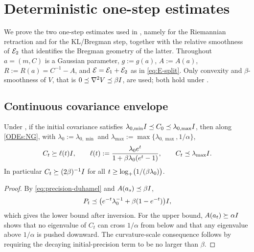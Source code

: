 \section{Deterministic one-step estimates}
\label{app:det-proofs}

We prove the two one-step estimates used in , namely
 for the Riemannian retraction and  for the
KL/Bregman step, together with the relative smoothness of $\mathcal{E}_2$ that identifies the
Bregman geometry of the latter. Throughout $a=(m,C)$ is a Gaussian parameter, $g:=g(a)$,
$A:=A(a)$, $R:=R(a)=C^{-1}-A$, and $\mathcal{E}=\mathcal{E}_1+\mathcal{E}_2$ as in \eqref{eq:E-split}. Only
convexity and $\beta$-smoothness of $V$, that is $0\preceq\nabla^2V\preceq\beta I$, are used;
both hold under .

\subsection{Continuous covariance envelope}

\begin{lemma}\label{lem:cov-cont}
    Under , if the initial covariance satisfies
    $\lambda_{0,\min}I\preceq C_0\preceq\lambda_{0,\max}I$, then along \eqref{ODEs:NG},
    with $\lambda_0:=\lambda_{0,\min}$ and
    $\lambda_{\max}:=\max\{\lambda_{0,\max},1/\alpha\}$,
    \begin{equation*}
        C_t\succeq\ell(t)I,
        \qquad
        \ell(t):=\frac{\lambda_0e^t}{1+\beta\lambda_0(e^t-1)},
        \qquad
        C_t\preceq\lambda_{\max}I .
    \end{equation*}
    In particular $C_t\succeq(2\beta)^{-1}I$ for all
    $t\geq\log_+\bigl(1/(\beta\lambda_0)\bigr)$.
\end{lemma}

\begin{proof}
    By \eqref{eq:precision-duhamel} and $A(a_s)\preceq\beta I$,
    \begin{equation*}
        P_t\preceq\bigl(e^{-t}\lambda_0^{-1}+\beta(1-e^{-t})\bigr)I,
    \end{equation*}
    which gives the lower bound after inversion. For the upper bound, $A(a_t)\succeq\alpha I$
    shows that no eigenvalue of $C_t$ can cross $1/\alpha$ from below and that any eigenvalue
    above $1/\alpha$ is pushed downward. The curvature-scale consequence follows by requiring
    the decaying initial-precision term to be no larger than $\beta$.
\end{proof}

